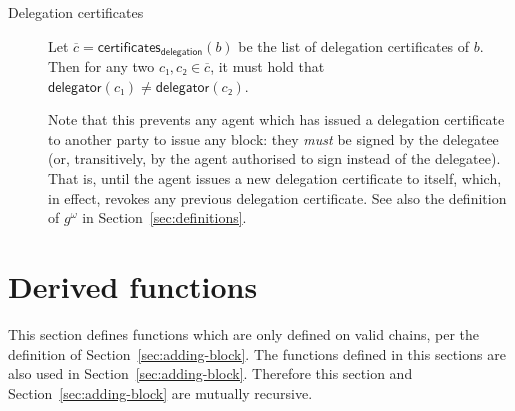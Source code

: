 \documentclass{article}
\newcommand{\transitivefix}[1]{{#1}^ω}
\newcommand{\delegator}[1]{\mathsf{delegator}(#1)}
\newcommand{\delegationcertificates}[1]{\mathsf{certificates}_\mathsf{delegation}(#1)}
\begin{document}
\begin{description}
\begin{description}
\begin{description}
    \end{description}
  \end{description}

\item[Delegation certificates] Let
  $\overline{c}=\delegationcertificates{b}$ be the list of delegation
  certificates of $b$. Then for any two $c₁,c₂∈\overline{c}$, it must
  hold that $\delegator{c₁}≠\delegator{c₂}$.

  Note that this prevents any agent which has issued a delegation
  certificate to another party to issue any block: they \emph{must} be
  signed by the delegatee (or, transitively, by the agent authorised
  to sign instead of the delegatee). That is, until the agent issues a
  new delegation certificate to itself, which, in effect, revokes any
  previous delegation certificate. See also the definition of
  $\transitivefix{g}$ in Section~\ref{sec:definitions}.

\end{description}

\section{Derived functions}
\label{sec:derived-functions}

This section defines functions which are only defined on valid chains,
per the definition of Section~\ref{sec:adding-block}. The functions
defined in this sections are also used in
Section~\ref{sec:adding-block}. Therefore this section and
Section~\ref{sec:adding-block} are mutually recursive.
\end{document}
